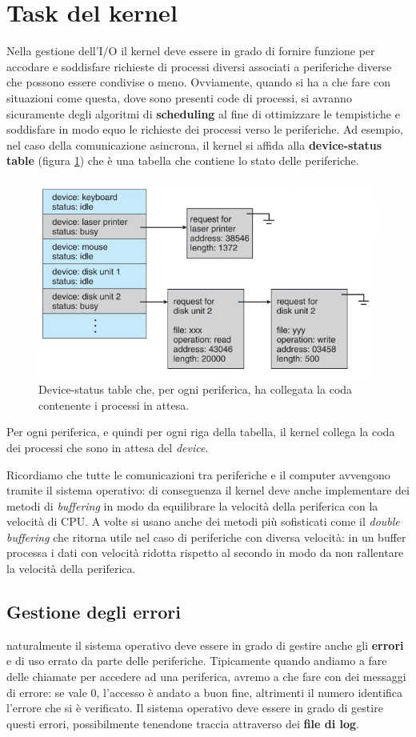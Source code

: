 \section{Task del kernel}
Nella gestione dell'I/O il kernel deve essere in grado di fornire funzione per accodare e soddisfare richieste di processi diversi associati a periferiche diverse che possono essere condivise o meno. Ovviamente, quando si ha a che fare con situazioni come questa, dove sono presenti code di processi, si avranno sicuramente degli algoritmi di \textbf{scheduling} al fine di ottimizzare le tempistiche e soddisfare in modo equo le richieste dei processi verso le periferiche. Ad esempio, nel caso della comunicazione asincrona, il kernel si affida alla \textbf{device-status table} (figura \ref{fig:device-status table}) che è una tabella che contiene lo stato delle periferiche.
\begin{figure}[h]
    \centering
    \includegraphics[width = .65\textwidth]{../res/imgs/IO system/device-status table.png}
    \caption{Device-status table che, per ogni periferica, ha collegata la coda contenente i processi in attesa.}
    \label{fig:device-status table}
\end{figure}
Per ogni periferica, e quindi per ogni riga della tabella, il kernel collega la coda dei processi che sono in attesa del \textit{device}.

Ricordiamo che tutte le comunicazioni tra periferiche e il computer avvengono tramite il sistema operativo: di conseguenza il kernel deve anche implementare dei metodi di \textit{buffering} in modo da equilibrare la velocità della periferica con la velocità di CPU. A volte si usano anche dei metodi più sofisticati come il \textit{double buffering} che ritorna utile nel caso di periferiche con diversa velocità: in un buffer processa i dati con velocità ridotta rispetto al secondo in modo da non rallentare la velocità della periferica. 

\subsection{Gestione degli errori}
naturalmente il sistema operativo deve essere in grado di gestire anche gli \textbf{errori} e di uso errato da parte delle periferiche. Tipicamente quando andiamo a fare delle chiamate per accedere ad una periferica, avremo a che fare con dei messaggi di errore: se vale 0, l'accesso è andato a buon fine, altrimenti il numero identifica l'errore che si è verificato. Il sistema operativo deve essere in grado di gestire questi errori, possibilmente tenendone traccia attraverso dei \textbf{file di log}. 

